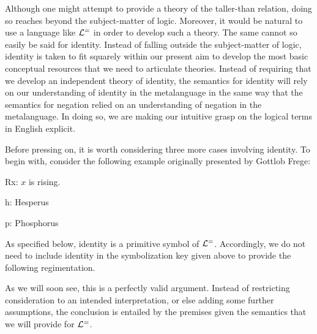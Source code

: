 Although one might attempt to provide a theory of the taller-than relation, doing so reaches beyond the subject-matter of logic.
Moreover, it would be natural to use a language like $\mathcal{L}^{=}$ in order to develop such a theory. 
The same cannot so easily be said for identity.
Instead of falling outside the subject-matter of logic, identity is taken to fit squarely within our present aim to develop the most basic conceptual resources that we need to articulate theories.
Instead of requiring that we develop an independent theory of identity, the semantics for identity will rely on our understanding of identity in the metalanguage in the same way that the semantics for negation relied on an understanding of negation in the metalanguage.
In doing so, we are making our intuitive grasp on the logical terms in English explicit.

Before pressing on, it is worth considering three more cases involving identity.
To begin with, consider the following example originally presented by Gottlob Frege:

\begin{multicols}{2}

\begin{ekey}
    \item[Rx:] $x$ is rising.
    \item[h:] Hesperus
    \item[p:] Phosphorus
\end{ekey}

\begin{earg}
\end{earg}

\end{multicols}

As specified below, identity is a primitive symbol of $\mathcal{L}^{=}$.
Accordingly, we do not need to include identity in the symbolization key given above to provide the following regimentation.

\begin{earg}
\end{earg}

As we will soon see, this is a perfectly valid argument.
Instead of restricting consideration to an intended interpretation, or else adding some further assumptions, the conclusion is entailed by the premises given the semantics that we will provide for $\mathcal{L}^{=}$.

